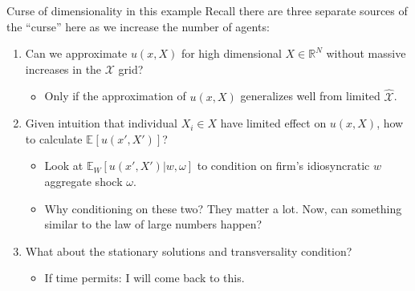 \documentclass[aspectratio=169,10pt]{beamer}
\newcommand{\R}{\ensuremath{\mathbb{R}}}
\newcommand{\expec}[2][]{\ensuremath{\mathbb{E}_{{#1}}\left[ {#2} \right]}}
\newcommand{\Xdom}{\mathcal{X}}
\newcommand{\Xtrain}{\hat{\mathcal{X}}}
\begin{document}
		\begin{frame}{Curse of dimensionality in this example}
			Recall there are three separate sources of the ``curse'' here as we increase the number of agents:
			\begin{enumerate}
				\item Can we approximate $u(x,X)$ for high dimensional $X\in \R^N$ without massive increases in the $\Xdom$ grid?
					  \begin{itemize}
						  \item Only if the approximation of $u(x,X)$ generalizes well from limited $\Xtrain$.\smallskip
					  \end{itemize}\medskip
		
				\item Given intuition that individual $X_i \in X$ have limited effect on $u(x,X)$, how to calculate $\expec{u(x',X')}$?\smallskip
					  \begin{itemize}
						  \item  Look at $\mathbb{E}_W[u(x', X')|w, \omega]$ to condition on firm's idiosyncratic $w$ aggregate shock $\omega$.\smallskip
						  \item Why conditioning on these two? They matter a lot. Now, can something similar to the law of large numbers happen?
					  \end{itemize}\medskip
				\item What about the stationary solutions and transversality condition?\smallskip
					  \begin{itemize}
						  
						  \smallskip
						  \item If time permits: I will come back to this.
					  \end{itemize}
			\end{enumerate}
		\end{frame}
		
\end{document}
